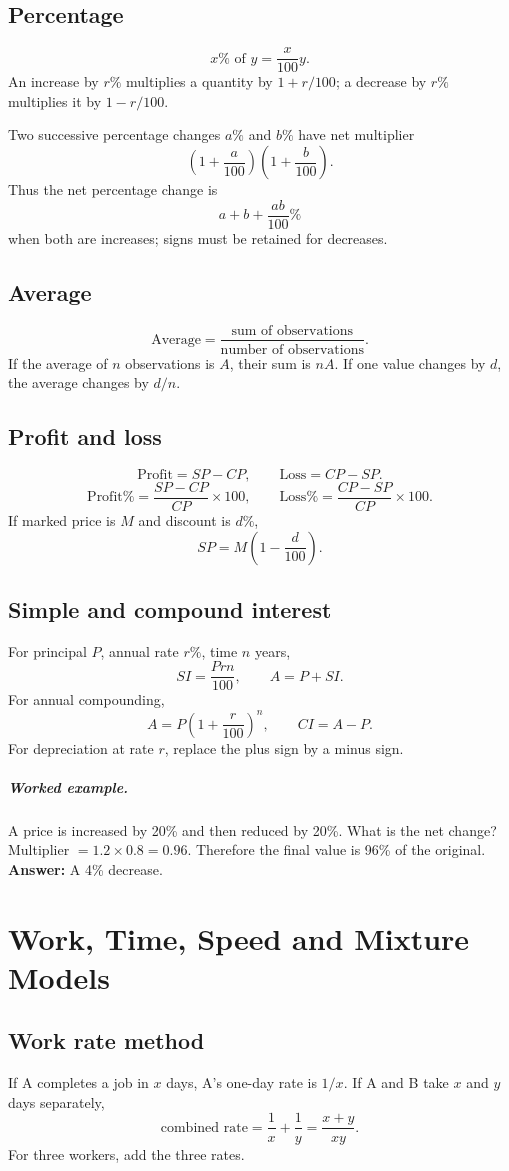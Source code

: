 \documentclass[12pt,a4paper,oneside]{book}
\newcommand{\ans}[1]{\textbf{Answer:} #1}
\newcommand{\q}[2]{\paragraph{#1} #2}
\begin{document}
\section{Percentage}
\[x\%\text{ of }y=\frac{x}{100}y.\]
An increase by \(r\%\) multiplies a quantity by \(1+r/100\); a decrease by \(r\%\) multiplies it by \(1-r/100\).

Two successive percentage changes \(a\%\) and \(b\%\) have net multiplier
\[\left(1+\frac a{100}\right)\left(1+\frac b{100}\right).\]
Thus the net percentage change is
\[a+b+\frac{ab}{100}\%\]
when both are increases; signs must be retained for decreases.

\section{Average}
\[\text{Average}=\frac{\text{sum of observations}}{\text{number of observations}}.\]
If the average of \(n\) observations is \(A\), their sum is \(nA\). If one value changes by \(d\), the average changes by \(d/n\).

\section{Profit and loss}
\[\text{Profit}=SP-CP,\qquad \text{Loss}=CP-SP.\]
\[\text{Profit\%}=\frac{SP-CP}{CP}\times100,\qquad
\text{Loss\%}=\frac{CP-SP}{CP}\times100.\]
If marked price is \(M\) and discount is \(d\%\),
\[SP=M\left(1-\frac d{100}\right).\]

\section{Simple and compound interest}
For principal \(P\), annual rate \(r\%\), time \(n\) years,
\[SI=\frac{Prn}{100},\qquad A=P+SI.\]
For annual compounding,
\[A=P\left(1+\frac r{100}\right)^n,\qquad CI=A-P.\]
For depreciation at rate \(r\), replace the plus sign by a minus sign.

\q{Worked example.}{A price is increased by 20\% and then reduced by 20\%. What is the net change?}
Multiplier \(=1.2\times0.8=0.96\). Therefore the final value is 96\% of the original.
\ans{A 4\% decrease.}

\chapter[Work, Speed and Mixtures]{Work, Time, Speed and Mixture Models}
\section{Work rate method}
If A completes a job in \(x\) days, A's one-day rate is \(1/x\). If A and B take \(x\) and \(y\) days separately,
\[\text{combined rate}=\frac1x+\frac1y=\frac{x+y}{xy}.\]
For three workers, add the three rates.
\end{document}

